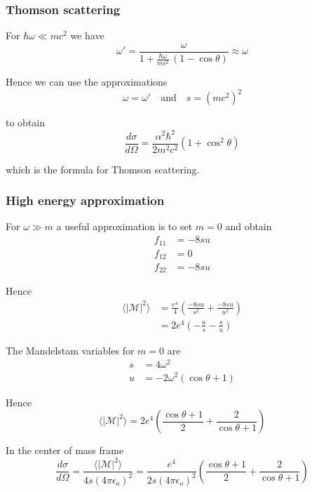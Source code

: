 \subsubsection*{Thomson scattering}

For $\hbar\omega\ll mc^2$ we have
\begin{equation*}
\omega'=\frac{\omega}{1+\frac{\hbar\omega}{mc^2}\,(1-\cos\theta)}\approx\omega
\end{equation*}

Hence we can use the approximations
\begin{equation*}
\omega=\omega'\quad\text{and}\quad s=(mc^2)^2
\end{equation*}

to obtain
\begin{equation*}
\frac{d\sigma}{d\Omega}=\frac{\alpha^2\hbar^2}{2m^2c^2}\left(1+\cos^2\theta\right)
\end{equation*}

which is the formula for Thomson scattering.

\subsubsection*{High energy approximation}

For $\omega\gg m$ a useful approximation is to set $m=0$ and obtain
\begin{align*}
f_{11}&=-8su
\\
f_{12}&=0
\\
f_{22}&=-8su
\end{align*}

Hence
\begin{align*}
\langle|\mathcal{M}|^2\rangle
&=\frac{e^4}{4}
\left(\frac{-8su}{s^2}+\frac{-8su}{u^2}\right)
\\
&=2e^4
\left(-\frac{u}{s}-\frac{s}{u}\right)
\end{align*}

The Mandelstam variables for $m=0$ are
\begin{align*}
s&=4\omega^2
\\
u&=-2\omega^2(\cos\theta+1)
\end{align*}

Hence
\begin{equation*}
\langle|\mathcal{M}|^2\rangle
=2e^4\left(
\frac{\cos\theta+1}{2}+\frac{2}{\cos\theta+1}
\right)
\end{equation*}

In the center of mass frame
\begin{equation*}
\frac{d\sigma}{d\Omega}=\frac{\langle|\mathcal{M}|^2\rangle}{4s(4\pi\epsilon_o)^2}
=\frac{e^4}{2s(4\pi\epsilon_o)^2}\left(\frac{\cos\theta+1}{2}+\frac{2}{\cos\theta+1}\right)
\end{equation*}

